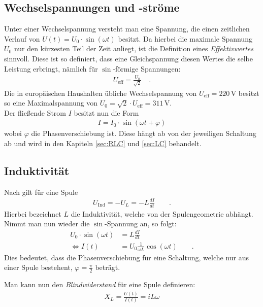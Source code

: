 \documentclass[12pt,a4paper,titlepage,headinclude,bibtotoc]{scrartcl}
\begin{document}
\subsection{Wechselspannungen und -ströme}
Unter einer Wechselspannung versteht man eine Spannung, die einen zeitlichen Verlauf von $U(t)= U_0\cdot\sin(\omega t)$ besitzt.
Da hierbei die maximale Spannung $U_0$ nur den kürzesten Teil der Zeit anliegt, ist die Definition eines \emph{Effektivwertes} sinnvoll.
Diese ist so definiert, dass eine Gleichspannung diesen Wertes die selbe Leistung erbringt, nämlich für $\sin$-förmige Spannungen:
\begin{align*}
U_\text{eff}=\frac{U_0}{\sqrt2}\quad .
\end{align*}
Die in europäischen Haushalten übliche Wechselspannung von $U_\text{eff}=220\,\si\volt$ besitzt so eine Maximalspannung von $U_0=\sqrt2\cdot U_\text{eff}=311\,\si\volt$.\\

Der fließende Strom $I$ besitzt nun die Form
\begin{align*}
I=I_0\cdot\sin(\omega t+\varphi)
\end{align*}
wobei $\varphi$ die Phasenverschiebung ist.
Diese hängt ab von der jeweiligen Schaltung ab und wird in den Kapiteln \ref{sec:RLC} und \ref{sec:LC} behandelt.

\subsection{Induktivität}
Nach \cite[S. 313]{griffith} gilt für eine Spule
\begin{align}
U_\text{Ind}=-U_L=-L\frac{dI}{dt}\qquad .
\end{align}
Hierbei bezeichnet $L$ die Induktivität, welche von der Spulengeometrie abhängt.
Nimmt man nun wieder die $\sin$-Spannung an, so folgt:
\begin{align*}
U_0\cdot\sin(\omega t)&=L\frac{dI}{dt}\\
\Leftrightarrow I(t)&=U_0\frac{1}{\omega L}\cos(\omega t)\qquad .
\end{align*}
Dies bedeutet, dass die Phasenverschiebung für eine Schaltung, welche nur aus einer Spule bestehent, $\varphi=\frac{\pi}{2}$ beträgt.

Man kann nun den \emph{Blindwiderstand} für eine Spule definieren:
\begin{align}
X_L=\frac{U(t)}{I(t)}=iL\omega
\end{align}
\end{document}
